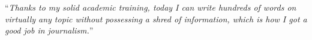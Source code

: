 \documentclass[
11pt, %
oneside, %
ukrainian,
english, %
singlespacing, %
headsepline, %
]{BachelorMasterThesis} %
\begin{document}


 
 



\vspace*{0.2\textheight}

\noindent\enquote{\itshape Thanks to my solid academic training, today I can write hundreds of words on virtually any topic without possessing a shred of information, which is how I got a good job in journalism.}\bigbreak
\end{document}
